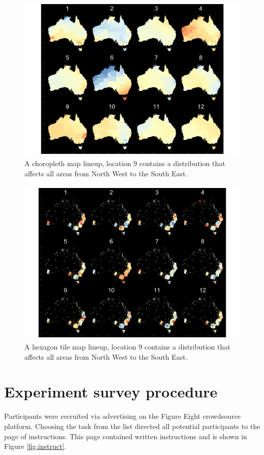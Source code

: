 \documentclass{monashthesis}
\begin{document}
\begin{figure}[H]
\centering
\includegraphics[height=8cm]{lineups/nwse-geo6-1.pdf}
\caption{\label{fig:nwse-geo6}A choropleth map lineup, location 9 contains a distribution that affects all areas from North West to the South East.}
\end{figure}

\begin{figure}[H]
\centering
\includegraphics[height=8cm]{lineups/nwse-hex6-1.pdf}
\caption{\label{fig:nwse-hex6}A hexagon tile map lineup, location 9 contains a distribution that affects all areas from North West to the South East.}
\end{figure}

\hypertarget{experiment-survey-procedure}{%
\section{Experiment survey procedure}\label{experiment-survey-procedure}}

Participants were recruited via advertising on the Figure Eight crowdsource platform.
Choosing the task from the list directed all potential participants to the page of instructions.
This page contained written instructions and is shown in Figure \ref{fig:instruct}.
\end{document}
